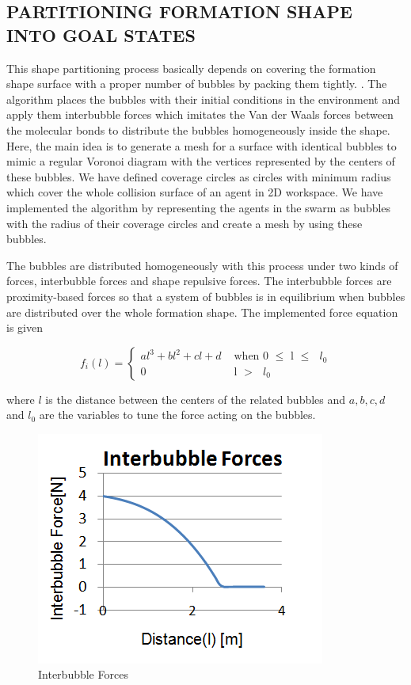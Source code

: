 \documentclass[letterpaper, 10 pt, conference]{ieeeconf}  %
\begin{document}
\subsection{PARTITIONING FORMATION SHAPE INTO GOAL STATES} \label{Partitioning_ref}		
This shape partitioning process basically depends on covering the formation shape surface with a proper number of bubbles by packing them tightly. \cite{27}.  The algorithm places the bubbles with their initial conditions in the environment and apply them interbubble forces which imitates the Van der Waals forces between the molecular bonds  to distribute the bubbles homogeneously inside the shape. Here, the main idea is to generate a mesh for a surface with identical bubbles to mimic a regular Voronoi diagram with the vertices represented by the centers of these bubbles. We have defined coverage circles as circles with minimum radius which cover the whole collision surface of an agent in 2D workspace. We have implemented the algorithm by representing the agents in the swarm as bubbles with the radius of their coverage circles and create a mesh by using these bubbles. 
			
The bubbles are distributed homogeneously with this process under two kinds of forces, interbubble forces and shape repulsive forces. The interbubble forces are proximity-based forces so that a system of bubbles is in equilibrium when bubbles are distributed over the whole formation shape. The implemented force equation is given
		
\begin{equation}
f_i(l) = \left\{ \begin{array}{rl}
al^3 + bl^2 + cl + d &\mbox{ when 0 $\leq$ l $\leq$ $l_0$} \\
0                               &\mbox{ l $>$ $l_0$}
\end{array} \right.
\end{equation}

where $l$ is the distance between the centers of the related bubbles and $a,b,c,d$ and $l_0$ are the variables to tune the force acting on the bubbles. 

    \begin{figure}[thpb]
      \centering     
      \includegraphics[scale = 0.45]{interbubble_forces}
     \caption{Interbubble Forces}
   \end{figure}   
   	
\end{document}
